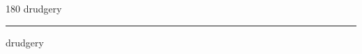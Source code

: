 
\begin{frame}
\begin{center}
\begin{turn}{180}
{\fontsize{2.5cm}{1em}\selectfont drudgery}
\end{turn}
\vspace{1em}\par  
\hrule
\vspace{1em}\par  
{\fontsize{2.5cm}{1em}\selectfont drudgery}
\end{center}
\end{frame}
